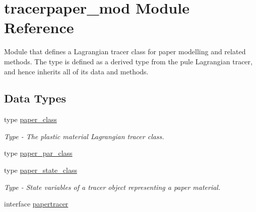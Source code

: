 \hypertarget{namespacetracerpaper__mod}{}\section{tracerpaper\+\_\+mod Module Reference}
\label{namespacetracerpaper__mod}


Module that defines a Lagrangian tracer class for paper modelling and related methods. The type is defined as a derived type from the pule Lagrangian tracer, and hence inherits all of it\textquotesingle{}s data and methods.  


\subsection*{Data Types}
\begin{DoxyCompactItemize}
\item 
type \mbox{\hyperlink{structtracerpaper__mod_1_1paper__class}{paper\+\_\+class}}
\begin{DoxyCompactList}\small\item\em Type -\/ The plastic material Lagrangian tracer class. \end{DoxyCompactList}\item 
type \mbox{\hyperlink{structtracerpaper__mod_1_1paper__par__class}{paper\+\_\+par\+\_\+class}}
\item 
type \mbox{\hyperlink{structtracerpaper__mod_1_1paper__state__class}{paper\+\_\+state\+\_\+class}}
\begin{DoxyCompactList}\small\item\em Type -\/ State variables of a tracer object representing a paper material. \end{DoxyCompactList}\item 
interface \mbox{\hyperlink{interfacetracerpaper__mod_1_1papertracer}{papertracer}}
\end{DoxyCompactItemize}
